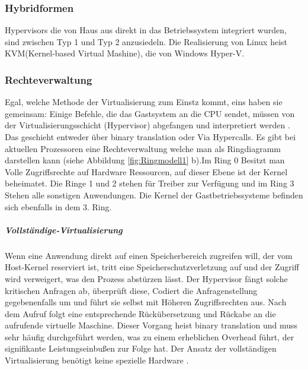 \subsubsection{Hybridformen}


Hypervisors die von Haus aus direkt in das Betriebssystem integriert wurden, sind zwischen Typ 1 und Typ 2 anzusiedeln. Die Realisierung von Linux heist KVM(Kernel-based Virtual Mashine), die von Windows Hyper-V.

\subsubsection{Rechteverwaltung}
Egal, welche Methode der Virtualisierung zum Einstz kommt, eins haben sie gemeinsam: Einige Befehle, die das Gastsystem an die CPU sendet, müssen von der Virtualisierungsschicht (Hypervisor) abgefangen und interpretiert werden \cite{Meinel2011VirtualisierungMarktubersicht}. Das geschieht entweder über \glqq binary translation \grqq{} oder Via Hypercalls.  Es gibt bei aktuellen Prozessoren eine Rechteverwaltung welche man als Ringdiagramm darstellen kann (siehe Abbildung \ref{fig:Ringmodell1} b).Im Ring 0 Besitzt man Volle Zugriffsrechte auf Hardware Ressourcen, auf dieser Ebene ist der Kernel beheimatet. Die Ringe 1 und 2 stehen für Treiber zur Verfügung und im Ring 3 Stehen alle sonstigen Anwendungen. Die Kernel der Gastbetriebssysteme befinden sich ebenfalls in dem 3. Ring.

\subparagraph{Vollständige-Virtualisierung}
 Wenn eine Anwendung direkt auf einen Speicherbereich zugreifen will, der vom Host-Kernel reserviert ist, tritt eine Speicherschutzverletzung auf und der Zugriff wird verweigert, was den Prozess abstürzen lässt. Der Hypervisor fängt solche kritischen Anfragen ab, überprüft diese, Codiert die Anfragenstellung gegebenenfalls um und führt sie selbst mit Höheren Zugriffsrechten aus. Nach dem Aufruf folgt eine entsprechende Rückübersetzung und Rückabe an die aufrufende virtuelle Maschine. Dieser Vorgang heist \glqq binary translation \grqq{} und muss sehr häufig durchgeführt werden, was zu einem erheblichen Overhead führt, der signifikante Leistungseinbußen zur Folge hat. Der Ansatz der vollständigen Virtualisierung benötigt keine spezielle Hardware \cite{Meinel2011VirtualisierungMarktubersicht}. 
 
